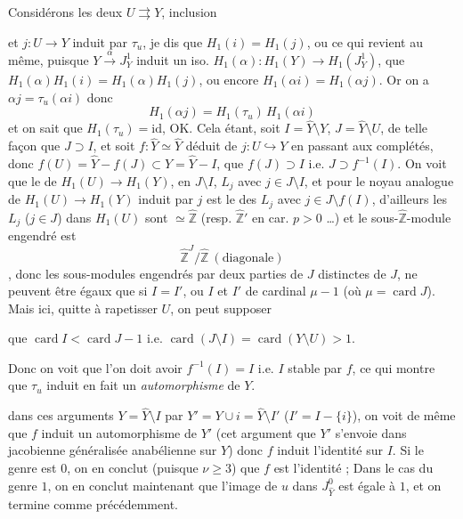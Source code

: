 \documentclass[11pt,a4paper]{article}
\begin{document}

Considérons les deux   $U \rightrightarrows Y$, inclusion


et $j : U \to Y$ induit par $\tau_u$, je dis que $H_1(i) = H_1(j)$, ou ce qui revient au même, puisque $Y \xrightarrow{\alpha} J^1_Y$ induit un iso. $H_1(\alpha) : H_1(Y) \to H_1(J^1_Y)$, que $H_1(\alpha) H_1(i) = H_1(\alpha) H_1(j)$, ou encore $H_1(\alpha i) = H_1(\alpha j)$. Or on a $\alpha j = \tau_u (\alpha i)$ donc 
\[
H_1(\alpha j) = H_1(\tau_u)\, H_1(\alpha i)
\]
et on sait que $H_1(\tau_u) = \mathrm{id}$, OK. Cela étant, soit $I = \hat{Y} \setminus Y$, $J = \hat{Y} \setminus U$, de telle façon que $J \supset I$, et soit $f : \hat{Y} \simeq \hat{Y}$ déduit de $j : U \hookrightarrow Y$ en passant aux complétés, donc  $f(U) = \hat{Y} - f(J) \subset Y = \hat{Y} - I$,  que $f(J) \supset I$ i.e. $J \supset f^{-1}(I)$. On voit que le  de $H_1(U) \to H_1(Y)$, \ill{} \ill{} en $J \setminus I$, \ill{} \add{\ill{}} $L_j$ avec $j \in J \setminus I$, et pour le noyau analogue de $H_1(U) \to H_1(Y)$ induit par $j$ est le \ill{} des $L_j$ avec $j \in J \setminus f(I)$, d'ailleurs les $L_j$ ($j \in J$) dans $H_1(U)$ sont $\simeq \widehat{\mathbb{Z}}$ (resp. $\widehat{\mathbb{Z}}'$ en car. $p > 0$ …) et le sous-$\widehat{\mathbb{Z}}$-module engendré est
\[
\widehat{\mathbb{Z}}^J / \widehat{\mathbb{Z}} \ (\text{diagonale})
\]
, donc  les sous-modules engendrés par deux parties  de $J$ distinctes de $J$, ne peuvent être égaux que si $I = I'$, ou $I$ et $I'$ de cardinal $\mu - 1$ (où $\mu = \operatorname{card} J$). Mais ici, quitte à rapetisser $U$, on peut supposer

que $\operatorname{card} I < \operatorname{card} J - 1$ i.e. $\operatorname{card}(J \setminus I) = \operatorname{card}(Y \setminus U) > 1$. 


 Donc on voit que l'on doit avoir $f^{-1}(I) = I$ i.e. $I$ stable par $f$, ce qui montre que $\tau_u$ induit en fait un \emph{automorphisme} de $Y$.  \struck{\ill{}}

 dans ces arguments $Y = \hat{Y} \setminus I$ par $Y' = Y \cup i = \hat{Y} \setminus I'$ ($I' = I - \{i\}$), on voit de même que $f$ induit un automorphisme de $Y'$ (cet argument  que $Y'$ s'envoie dans  jacobienne généralisée  \ill{} anabélienne sur $Y$)   \struck{\ill{}} donc $f$ induit l'identité sur $I$. Si le genre est $0$, on en conclut (puisque $\nu \geq 3$) que $f$ est l'identité ;  Dans le cas du genre $1$, on en conclut maintenant que l'image de $u$ dans $J^0_{\hat{Y}}$ est égale à $1$, et on termine comme précédemment.
\end{document}

